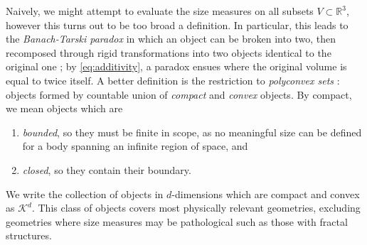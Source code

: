 Naively, we might attempt to evaluate the size measures on all subsets $V \subset \mathbb{R}^3$, however this turns out to be too broad a definition.
In particular, this leads to the \emph{Banach-Tarski paradox} in which an object can be broken into two, then recomposed through rigid transformations into two objects identical to the original one  \cite{BanachFM1924}; by \eqref{eq:additivity}, a paradox ensues where the original volume is equal to twice itself.
A better definition is the restriction to \emph{polyconvex sets}%
: objects formed by countable union of \emph{compact} and \emph{convex} objects.
By compact, we mean objects which are
\begin{enumerate}
\item \emph{bounded}, so they must be finite in scope, as no meaningful size can be defined for a body spanning an infinite region of space, and
\item \emph{closed}, so they contain their boundary.
\end{enumerate}
We write the collection of objects in $d$-dimensions which are compact and convex as $\mathcal{K}^d$.
This class of objects covers most physically relevant geometries, excluding geometries where size measures may be pathological such as those with fractal structures.


